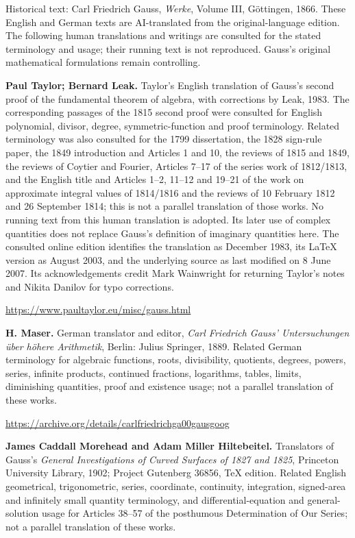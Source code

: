 \clearpage\thispagestyle{empty}\begingroup\small\raggedright
{}\medskip
Historical text: Carl Friedrich Gauss, \emph{Werke}, Volume III, Göttingen, 1866. These English and German texts are AI-translated from the original-language edition. The following human translations and writings are consulted for the stated terminology and usage; their running text is not reproduced. Gauss’s original mathematical formulations remain controlling.
\par\medskip\textbf{Paul Taylor; Bernard Leak.} Taylor’s English translation of Gauss’s second proof of the fundamental theorem of algebra, with corrections by Leak, 1983. The corresponding passages of the 1815 second proof were consulted for English polynomial, divisor, degree, symmetric-function and proof terminology. Related terminology was also consulted for the 1799 dissertation, the 1828 sign-rule paper, the 1849 introduction and Articles 1 and 10, the reviews of 1815 and 1849, the reviews of Coytier and Fourier, Articles 7–17 of the series work of 1812/1813, and the English title and Articles 1–2, 11–12 and 19–21 of the work on approximate integral values of 1814/1816 and the reviews of 10 February 1812 and 26 September 1814; this is not a parallel translation of those works. No running text from this human translation is adopted. Its later use of complex quantities does not replace Gauss’s definition of imaginary quantities here. The consulted online edition identifies the translation as December 1983, its LaTeX version as August 2003, and the underlying source as last modified on 8 June 2007. Its acknowledgements credit Mark Wainwright for returning Taylor’s notes and Nikita Danilov for typo corrections.\par
\url{https://www.paultaylor.eu/misc/gauss.html}
\par\medskip\textbf{H. Maser.} German translator and editor, \emph{Carl Friedrich Gauss’ Untersuchungen über höhere Arithmetik}, Berlin: Julius Springer, 1889. Related German terminology for algebraic functions, roots, divisibility, quotients, degrees, powers, series, infinite products, continued fractions, logarithms, tables, limits, diminishing quantities, proof and existence usage; not a parallel translation of these works.\par
\url{https://archive.org/details/carlfriedrichga00gausgoog}
\par\medskip\textbf{James Caddall Morehead and Adam Miller Hiltebeitel.} Translators of Gauss’s \emph{General Investigations of Curved Surfaces of 1827 and 1825}, Princeton University Library, 1902; Project Gutenberg 36856, TeX edition. Related English geometrical, trigonometric, series, coordinate, continuity, integration, signed-area and infinitely small quantity terminology, and differential-equation and general-solution usage for Articles 38–57 of the posthumous Determination of Our Series; not a parallel translation of these works.\par
